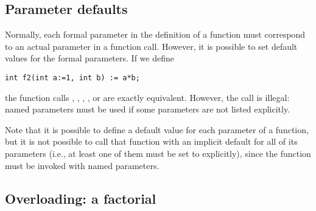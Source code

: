 \subsection{Parameter defaults}

Normally, each formal parameter in the definition of a function must
correspond to an actual parameter in a function call.
However, it is possible to set default values for the formal parameters.
If we define
\begin{lstlisting}
int f2(int a:=1, int b) := a*b;
\end{lstlisting}
the function calls , ,
, , or  are
exactly equivalent.
However, the call  is illegal: named
parameters must be used if some parameters are not listed explicitly.

Note that it is possible to define a default value for each parameter
of a function, but it is not possible to call that function with an
implicit default for all of its parameters
(i.e., at least one of them must be set to  explicitly),
since the function must be invoked with named parameters.

\begin{comment}
\subsection{A parallelizable \Code{for} statement}

The \Code{for} statement is a natural candidate for parallelization.
Indeed, {\smart} can recognize parallelism and perform
the concurrent computation of all the values specified in a \Code{for}
statement, provided no dependencies from one ``iteration'' to the next exist,

For example, the 100 values
\begin{lstlisting}
for (int i in {0..9}, int j in {0..9}) {
  int measure[i][j] := mymodel(i,j);
}
\end{lstlisting}
can be computed concurrently,
This reduces the total execution time in cases where the solution of
\Code{mymodel}
requires substantial computation, and multiple processors are available.
Such situations are common in parametric modeling studies.
\end{comment}

\subsection{Overloading: a  factorial} \label{SEC:realFactorial}

